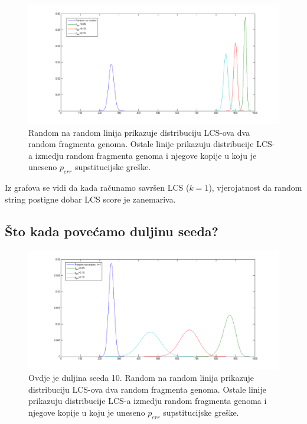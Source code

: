 \documentclass[11pt]{article} %
\begin{document}
\begin{figure}[H]
  \centering
    \includegraphics[width=1\textwidth]{lcs_k1.png}
  \caption{Random na random linija prikazuje distribuciju LCS-ova dva random fragmenta genoma. Ostale linije prikazuju distribucije LCS-a izmedju random fragmenta genoma i njegove kopije u koju je uneseno $p_{err}$ supstitucijske gre\v{s}ke.}
\end{figure}

Iz grafova se vidi da kada ra\v{c}unamo savr\v{s}en LCS ($k=1$), vjerojatnost da random string postigne dobar LCS score je zanemariva.

\subsection{\v{S}to kada pove\'{c}amo duljinu seeda?}

\begin{figure}[H]
  \centering
    \includegraphics[width=1\textwidth]{lcs_k10.png}
  \caption{Ovdje je duljina seeda 10. Random na random linija prikazuje distribuciju LCS-ova dva random fragmenta genoma. Ostale linije prikazuju distribucije LCS-a izmedju random fragmenta genoma i njegove kopije u koju je uneseno $p_{err}$ supstitucijske gre\v{s}ke.}
\end{figure}
\end{document}
